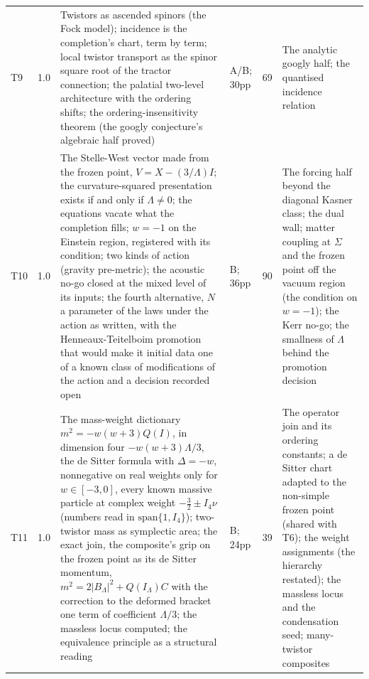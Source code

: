 \documentclass[11pt]{article}
\theoremstyle{definition}
\theoremstyle{plain}
\begin{document}
\begin{longtable}{p{} p{} p{} p{} p{} p{}}
T9 & 1.0 & Twistors as ascended spinors (the Fock model); incidence is the completion's chart, term by term; local twistor transport as the spinor square root of the tractor connection; the palatial two-level architecture with the ordering shifts; the ordering-insensitivity theorem (the googly conjecture's algebraic half proved) \cite{ButlerT9} & A/B; 30pp & 69 & The analytic googly half; the quantised incidence relation \\
T10 & 1.0 & The Stelle-West vector made from the frozen point, $V = X - (3/\Lambda)I$; the curvature-squared presentation exists if and only if $\Lambda \neq 0$; the equations vacate what the completion fills; $w = -1$ on the Einstein region, registered with its condition; two kinds of action (gravity pre-metric); the acoustic no-go closed at the mixed level of its inputs; the fourth alternative, $N$ a parameter of the laws under the action as written, with the Henneaux-Teitelboim promotion that would make it initial data one of a known class of modifications of the action and a decision recorded open \cite{ButlerT10} & B; 36pp & 90 & The forcing half beyond the diagonal Kasner class; the dual wall; matter coupling at $\Sigma$ and the frozen point off the vacuum region (the condition on $w = -1$); the Kerr no-go; the smallness of $\Lambda$ behind the promotion decision \\
T11 & 1.0 & The mass-weight dictionary $m^{2} = -w(w+3)Q(I)$, in dimension four $-w(w+3)\Lambda/3$, the de Sitter formula with $\Delta = -w$, nonnegative on real weights only for $w \in [-3, 0]$, every known massive particle at complex weight $-\tfrac32 \pm I_4\nu$ (numbers read in $\mathrm{span}\{1, I_4\}$); two-twistor mass as symplectic area; the exact join, the composite's grip on the frozen point as its de Sitter momentum, $m^{2} = 2|B_{\Lambda}|^{2} + Q(I_{\Lambda}) C$ with the correction to the deformed bracket one term of coefficient $\Lambda/3$; the massless locus computed; the equivalence principle as a structural reading \cite{ButlerT11} & B; 24pp & 39 & The operator join and its ordering constants; a de Sitter chart adapted to the non-simple frozen point (shared with T6); the weight assignments (the hierarchy restated); the massless locus and the condensation seed; many-twistor composites \\

\end{longtable}
\end{document}
